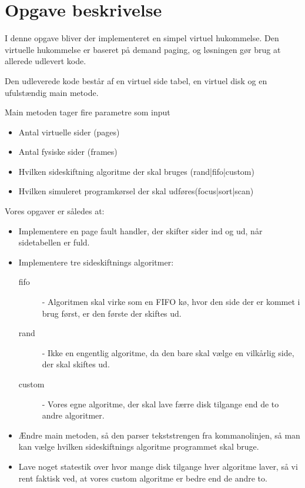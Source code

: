 \section{Opgave beskrivelse}

I denne opgave bliver der implementeret en simpel virtuel hukommelse. Den virtuelle hukommelse er baseret på demand paging, og løsningen gør brug at allerede udlevert kode.

Den udleverede kode består af en virtuel side tabel, en virtuel disk og en ufulstændig main metode.

Main metoden tager fire parametre som input

\begin{itemize}
\item Antal virtuelle sider (pages)
\item Antal fysiske sider (frames)
\item Hvilken sideskiftning algoritme der skal bruges (rand|fifo|custom)
\item Hvilken simuleret programkørsel der skal udføres(focus|sort|scan)
\end{itemize} 

Vores opgaver er således at:

\begin{itemize}
\item Implementere en page fault handler, der skifter sider ind og ud, når sidetabellen er fuld.

\item Implementere tre sideskiftnings algoritmer: 

\begin{description}
\item[fifo] - Algoritmen skal virke som en FIFO kø, hvor den side der er kommet i brug først, er den første der skiftes ud. 
\item[rand] - Ikke en engentlig algoritme, da den bare skal vælge en vilkårlig side, der skal skiftes ud.
\item[custom] - Vores egne algoritme, der skal lave færre disk tilgange end de to andre algoritmer.
\end{description}

\item Ændre main metoden, så den parser tekststrengen fra kommanolinjen, så man kan vælge hvilken sideskiftnings algoritme programmet skal bruge.

\item Lave noget statestik over hvor mange disk tilgange hver algoritme laver, så vi rent faktisk ved, at vores custom algoritme er bedre end de andre to.
\end{itemize}